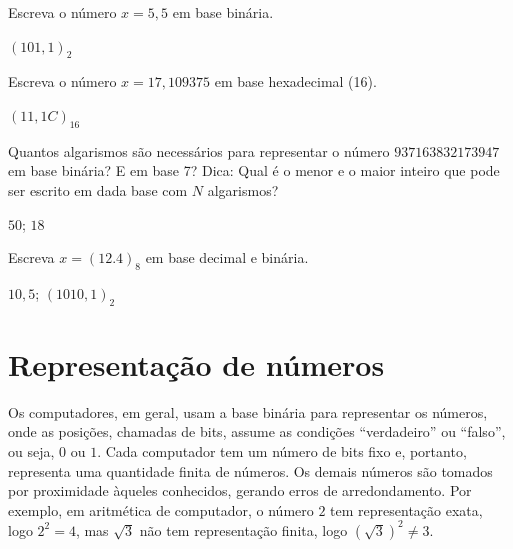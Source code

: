 \documentclass[main.tex]{subfiles}
\begin{document}
\begin{Exercise} Escreva o número $x=5,5$ em base binária.
\end{Exercise}
\begin{Answer}
  \begin{tiny}
    $(101,1)_2$
  \end{tiny}
\end{Answer}


\begin{Exercise} Escreva o número $x=17,109375$ em base hexadecimal (16).
\end{Exercise}
\begin{Answer}
  \begin{tiny}
    $(11,1C)_{16}$    
  \end{tiny}
\end{Answer}

\begin{Exercise} Quantos algarismos são necessários para representar o número $937163832173947$ em base binária? E em base 7? Dica: Qual é o menor e o maior inteiro que pode ser escrito em dada base com $N$ algarismos?
\end{Exercise}
\begin{Answer}
  \begin{tiny}
    $50$; $18$    
  \end{tiny}
\end{Answer}


\begin{Exercise} Escreva $x=(12.4)_8$ em base decimal e binária.
\end{Exercise}
\begin{Answer}
  \begin{tiny}
    $10,5$; $(1010,1)_2$
  \end{tiny}
\end{Answer}


\section{Representação de números}

Os computadores, em geral, usam a base binária para representar os números, onde as posições, chamadas de bits, assume as condições ``verdadeiro'' ou ``falso'', ou seja, $0$ ou $1$. Cada computador tem um número de bits fixo e, portanto, representa uma quantidade finita de números. Os demais números são tomados por proximidade àqueles conhecidos, gerando erros de arredondamento. Por exemplo, em aritmética de computador, o número $2$ tem representação exata, logo $2^2=4$, mas $\sqrt{3}$ não tem representação finita, logo $(\sqrt{3})^2\neq 3$. 
\end{document}
